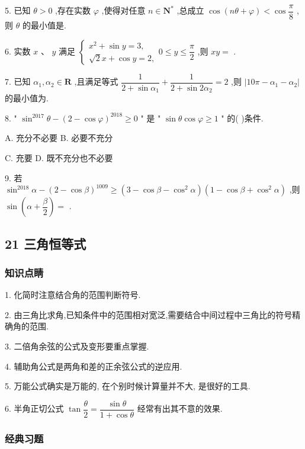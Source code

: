 5. 已知 $\theta  > 0$ ,存在实数 $\varphi$ ,使得对任意 $n \in  {\mathbf{N}}^{ * }$ ,总成立 $\cos \left( {{n\theta } + \varphi }\right)  < \cos \dfrac{\pi }{8}$ ,则 $\theta$ 的最小值是\blkda{}.

6. 实数 $x$ 、 $y$ 满足 $\left\{  {\begin{array}{l} {x}^{2} + \sin y = 3, \\  \sqrt{2}x + \cos y = 2, \end{array}0 \leq  y \leq  \dfrac{\pi }{2}}\right.$ ,则 ${xy} =$ \blkda{}.

7. 已知 ${\alpha }_{1},{\alpha }_{2} \in  \mathbf{R}$ ,且满足等式 $\dfrac{1}{2 + \sin {\alpha }_{1}} + \dfrac{1}{2 + \sin 2{\alpha }_{2}} = 2$ ,则 $\left| {{10\pi } - {\alpha }_{1} - {\alpha }_{2}}\right|$ 的最小值为\blkda{}.

8. " ${\sin }^{2017}\theta  - {\left( 2 - \cos \varphi \right) }^{2018} \geq  0$ " 是 " $\sin \theta \cos \varphi  \geq  1$ " 的(   )条件.

A. 充分不必要 B. 必要不充分

C. 充要 D. 既不充分也不必要

9. 若 ${\sin }^{2018}\alpha  - {\left( 2 - \cos \beta \right) }^{1009} \geq  \left( {3 - \cos \beta  - {\cos }^{2}\alpha }\right) \left( {1 - \cos \beta  + {\cos }^{2}\alpha }\right)$ ,则 $\sin \left( {\alpha  + \dfrac{\beta }{2}}\right)  =$ \blkda{}.

\subsection*{21 三角恒等式}

\subsubsection*{知识点睛}

1. 化简时注意结合角的范围判断符号.

2. 由三角比求角,已知条件中的范围相对宽泛,需要结合中间过程中三角比的符号精确角的范围.

3. 二倍角余弦的公式及变形要重点掌握.

4. 辅助角公式是两角和差的正余弦公式的逆应用.

5. 万能公式确实是万能的, 在个别时候计算量并不大, 是很好的工具.

6. 半角正切公式 $\tan \dfrac{\theta }{2} = \dfrac{\sin \theta }{1 + \cos \theta }$ 经常有出其不意的效果.

\subsubsection*{经典习题}


